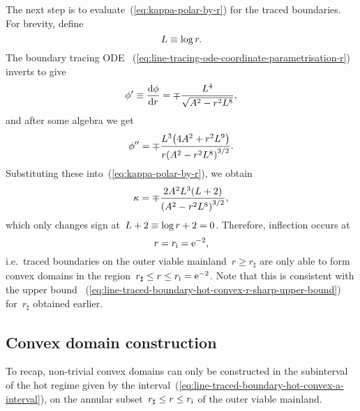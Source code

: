 The next step is to evaluate~(\ref{eq:kappa-polar-by-r})
for the traced boundaries.
For brevity, define
\begin{equation}
  L \ideq \log r.
  \label{eq:line-abbreviation-l}
\end{equation}
The boundary tracing ODE~%
  (\ref{eq:line-tracing-ode-coordinate-parametrisation-r})
inverts to give
\begin{equation}
  \phi' \ideq \tder{\phi}{r} = \mp \frac{L^4}{\sqrt{A^2 - r^2 L^8}},
  \label{eq:line-traced-boundary-phi-r-derivative}
\end{equation}
and after some algebra we get
\begin{equation}
  \phi'' =
  \mp \frac{L^3 \roundbr*{4 A^2 + r^2 L^9}}{r \roundbr*{A^2 - r^2 L^8}^{3/2}}.
  \label{eq:line-traced-boundary-phi-r-second-derivative}
\end{equation}
Substituting these into~(\ref{eq:kappa-polar-by-r}),
we obtain
\begin{equation}
  \kappa =
  \mp \frac{2 A^2 L^3 (L + 2)}{\roundbr*{A^2 - r^2 L^8}^{3/2}},
  \label{eq:line-traced-boundary-kappa-polar-by-r}
\end{equation}
which only changes sign at~$L + 2 \equiv \log r + 2 = 0$.
Therefore, inflection occurs at
\begin{equation}
  r = r_\infl = \ee^{-2},
  \label{eq:line-r-inflection}
\end{equation}
i.e.~traced boundaries on the outer viable mainland~$r \ge r_\sharp$
are only able to form convex domains
in the region~$r_\sharp \le r \le r_{\mathrm{i}} = \mathrm{e}^{-2}$.
Note that this is consistent with the upper bound~%
  (\ref{eq:line-traced-boundary-hot-convex-r-sharp-upper-bound})
for~$r_\sharp$ obtained earlier.

\subsection{Convex domain construction}
\label{sec:polar.convex.construction}

To recap, non-trivial convex domains can only be constructed
in the subinterval of the hot regime
given by the interval~(\ref{eq:line-traced-boundary-hot-convex-a-interval}),
on the annular subset~$r_\sharp \le r \le r_{\mathrm{i}}$
of the outer viable mainland.

\begin{figure}
\end{figure}

